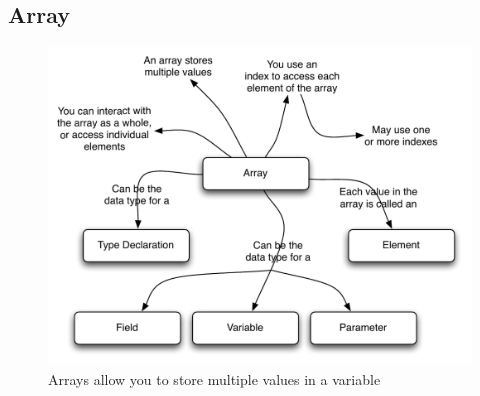 \clearpage
\subsection{Array} %
\label{sub:array}

\begin{figure}[h]
   \centering
   \includegraphics[width=\textwidth]{./topics/type-decl/diagrams/Array} 
   \caption{Arrays allow you to store multiple values in a variable}
   \label{fig:type-decl-array}
\end{figure}


